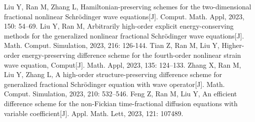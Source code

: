    \begin{mypaper}
      \begin{thebibliography}{99}  
       Liu Y, Ran M, Zhang L, Hamiltonian-preserving schemes for the two-dimensional fractional nonlinear Schrödinger wave equations[J]. Comput. Math. Appl, 2023, 150: 54–69.
       Liu Y, Ran M, Arbitrarily high-order explicit energy-conserving methods for the generalized nonlinear fractional Schrödinger wave equations[J]. Math. Comput. Simulation, 2023, 216: 126-144.
       Tian Z, Ran M, Liu Y, Higher-order energy-preserving difference scheme for the fourth-order nonlinear strain wave equation, Comput[J]. Math. Appl, 2023, 135: 124–133.
       Zhang X, Ran M, Liu Y, Zhang L, A high-order structure-preserving difference scheme for generalized fractional Schrödinger equation with wave operator[J]. Math. Comput. Simulation, 2023, 210: 532–546.
       Feng Z, Ran M, Liu Y, An efficient difference scheme for the non-Fickian time-fractional diffusion equations with variable coefficient[J]. Appl. Math. Lett, 2023, 121: 107489.
      \end{thebibliography}
   \end{mypaper}
   